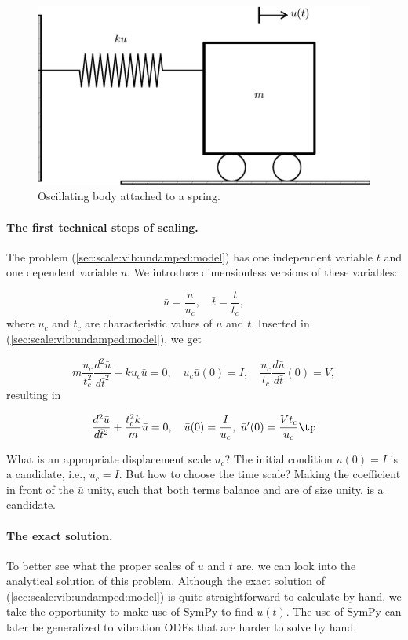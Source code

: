 \documentclass[graybox,envcountchap,sectrefs,final]{svmonodo}
\begin{document}
\begin{figure}[!ht]  %
  \centerline{\includegraphics[width=0.6\linewidth]{fig-scaling/oscillator_spring.pdf}}
  \caption{
  Oscillating body attached to a spring. \label{sec:scale:vib:undamped:sketch}
  }
\end{figure}


\paragraph{The first technical steps of scaling.}
The problem (\ref{sec:scale:vib:undamped:model}) has one independent
variable $t$ and one dependent variable $u$. We introduce dimensionless
versions of these variables:

\[ \bar u =\frac{u}{u_c},\quad\bar t = \frac{t}{t_c},\]
where $u_c$ and $t_c$ are characteristic values of $u$ and $t$.
Inserted in (\ref{sec:scale:vib:undamped:model}), we get

\[ m\frac{u_c}{t_c^2}\frac{d^2\bar u}{d\bar t^2} + ku_c\bar u = 0,
\quad u_c\bar u(0)=I,\quad \frac{u_c}{t_c}\frac{d\bar u}{d\bar t}(0)=V,\]
resulting in

\begin{equation}
\frac{d^2\bar u}{d\bar t^2} + \frac{t_c^2 k}{m}\bar u = 0,
\quad \bar u(0)=\frac{I}{u_c},\ \bar u'(0)=\frac{Vt_c}{u_c}\tp
\label{sec:scale:vib:undamped:model:scaled0}
\end{equation}

What is an appropriate displacement scale $u_c$? The initial condition
$u(0)=I$ is a candidate, i.e., $u_c=I$. But how to choose the time scale?
Making the coefficient in front of the $\bar u$ unity, such that
both terms balance and are of size unity, is a candidate.

\paragraph{The exact solution.}
To better see what the proper scales of $u$ and $t$ are, we can look
into the analytical solution of this problem.
Although the exact solution of
(\ref{sec:scale:vib:undamped:model}) is quite straightforward to calculate
by hand, we take the opportunity to make use of SymPy to
find $u(t)$. The use of SymPy can later be generalized to vibration
ODEs that are harder to solve by hand.
\end{document}
